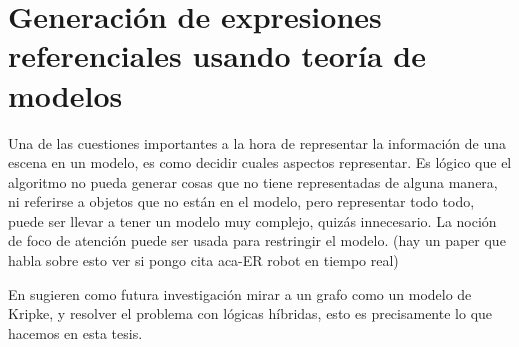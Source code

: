 


\section{Generaci\'on de expresiones referenciales usando teor\'ia de modelos}
\label{sec:gre-teoria-modelos}

Una de las cuestiones importantes a la hora de representar la informaci\'on de una escena en un modelo, es como decidir cuales aspectos representar.
Es l\'ogico que el algoritmo no pueda generar cosas que no tiene representadas de alguna manera, ni referirse a objetos que no est\'an en el modelo, pero representar todo todo, puede ser llevar a tener un modelo muy complejo, quiz\'as innecesario. La noci\'on de foco de atenci\'on puede ser usada para restringir el modelo. (hay un paper que habla sobre esto ver si pongo cita aca-ER robot en tiempo real)

En \cite{survey} sugieren como futura investigaci\'on mirar a un grafo como un modelo de Kripke, y resolver el problema con l\'ogicas h\'ibridas, esto es precisamente lo que hacemos en esta tesis. 

